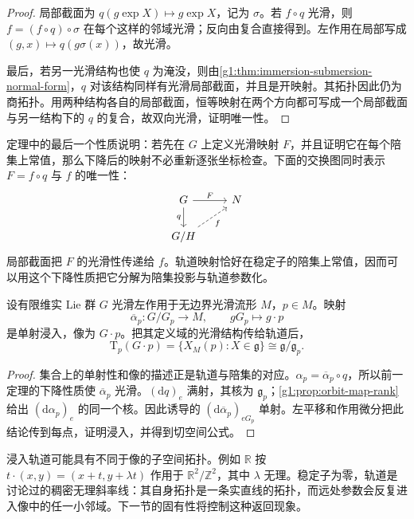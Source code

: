 \begin{proof}
	局部截面为 \(q(g\exp X)\mapsto g\exp X\)，记为 \(\sigma\)。若 \(f\circ q\) 光滑，则 \(f=(f\circ q)\circ\sigma\) 在每个这样的邻域光滑；反向由复合直接得到。左作用在局部写成 \((g,x)\mapsto q(g\sigma(x))\)，故光滑。

	最后，若另一光滑结构也使 \(q\) 为淹没，则由\cref{g1:thm:immersion-submersion-normal-form}，\(q\) 对该结构同样有光滑局部截面，并且是开映射。其拓扑因此仍为商拓扑。用两种结构各自的局部截面，恒等映射在两个方向都可写成一个局部截面与另一结构下的 \(q\) 的复合，故双向光滑，证明唯一性。
\end{proof}

定理中的最后一个性质说明：若先在 \(G\) 上定义光滑映射 \(F\)，并且证明它在每个陪集上常值，那么下降后的映射不必重新逐张坐标检查。下面的交换图同时表示 \(F=f\circ q\) 与 \(f\) 的唯一性：
\[
	\begin{tikzcd}
		G \arrow[r,"F"] \arrow[d,"q"'] & N \\
		G/H \arrow[ur,dashed,"f"'] &
	\end{tikzcd}
\]
局部截面把 \(F\) 的光滑性传递给 \(f\)。轨道映射恰好在稳定子的陪集上常值，因而可以用这个下降性质把它分解为陪集投影与轨道参数化。

\begin{proposition}\label{g1:prop:orbit-immersion}
	设有限维实 Lie 群 \(G\) 光滑左作用于无边界光滑流形 \(M\)，\(p\in M\)。映射
	\[
		\overline\alpha_p:G/G_p\longrightarrow M,
		\qquad gG_p\longmapsto g\cdot p
	\]
	是单射浸入，像为 \(G\cdot p\)。把其定义域的光滑结构传给轨道后，
	\begin{equation}\label{g1:eq:orbit-tangent-space}
		\mathrm{T}_p(G\cdot p)=\{X_M(p):X\in\mathfrak g\}
		\cong\mathfrak g/\mathfrak g_p.
	\end{equation}
\end{proposition}
\begin{proof}
	集合上的单射性和像的描述正是轨道与陪集的对应。\(\alpha_p=\overline\alpha_p\circ q\)，所以前一定理的下降性质使 \(\overline\alpha_p\) 光滑。\((\mathrm{d}q)_e\) 满射，其核为 \(\mathfrak g_p\)；\cref{g1:prop:orbit-map-rank}给出 \((\mathrm{d}\alpha_p)_e\) 的同一个核。因此诱导的 \((\mathrm{d}\overline\alpha_p)_{eG_p}\) 单射。左平移和作用微分把此结论传到每点，证明浸入，并得到切空间公式。
\end{proof}

浸入轨道可能具有不同于像的子空间拓扑。例如 \(\mathbb R\) 按 \(t\cdot(x,y)=(x+t,y+\lambda t)\) 作用于 \(\mathbb R^2/\mathbb Z^2\)，其中 \(\lambda\) 无理。稳定子为零，轨道是讨论过的稠密无理斜率线：其自身拓扑是一条实直线的拓扑，而远处参数会反复进入像中的任一小邻域。下一节的固有性将控制这种返回现象。


